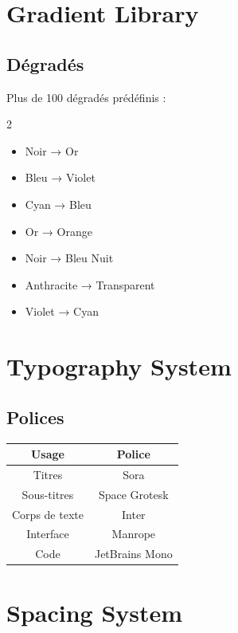 \documentclass[12pt,a4paper,oneside]{book}
\begin{document}
\chapter{Gradient Library}

\section{Dégradés}
Plus de 100 dégradés prédéfinis :
\begin{multicols}{2}
\begin{itemize}
\item Noir → Or
\item Bleu → Violet
\item Cyan → Bleu
\item Or → Orange
\item Noir → Bleu Nuit
\item Anthracite → Transparent
\item Violet → Cyan
\end{itemize}
\end{multicols}

\chapter{Typography System}

\section{Polices}
\begin{center}
\begin{tabular}{|c|c|}
\hline
\rowcolor{bleuIA}
\color{white}Usage & \color{white}Police \\
\hline
Titres & Sora \\
\hline
Sous-titres & Space Grotesk \\
\hline
Corps de texte & Inter \\
\hline
Interface & Manrope \\
\hline
Code & JetBrains Mono \\
\hline
\end{tabular}
\end{center}

\chapter{Spacing System}
\end{document}
